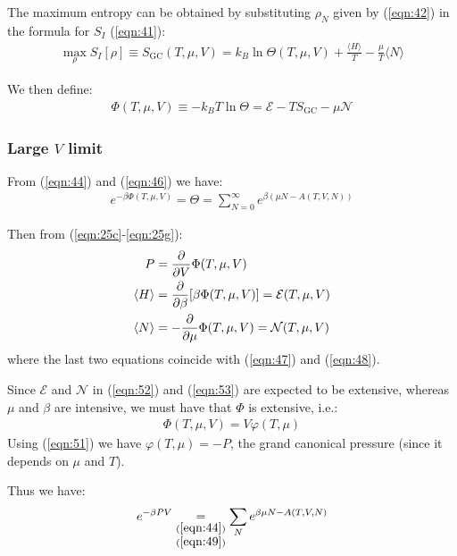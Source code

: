\documentclass[../template.tex]{subfiles}
\begin{document}
\medskip

The maximum entropy can be obtained by substituting $\rho_N$ given by (\ref{eqn:42}) in the formula for $S_I$ (\ref{eqn:41}):
\begin{align*}
    \max_\rho S_I[\rho] \equiv S_{\mathrm{GC}}(T, \mu, V) = k_B \ln \Theta(T, \mu, V) + \frac{\langle H \rangle}{T} - \frac{\mu}{T} \langle N \rangle  
\end{align*}

We then define: %
\begin{align}
    \label{eqn:49}
    \Phi(T, \mu, V) \equiv -k_B T \ln \Theta = \mathcal{E}- T S_{\mathrm{GC}} - \mu \mathcal{N}
\end{align}

\subsubsection{Large $V$ limit}
From (\ref{eqn:44}) and (\ref{eqn:46}) we have:
\begin{align}\label{eqn:50}
    e^{-\beta \Phi(T, \mu, V)} = \Theta = \sum_{N=0}^\infty e^{\beta(\mu N - A (T, V, N))}
\end{align}

Then from (\ref{eqn:25c}-\ref{eqn:25g}):
\begin{align}
    P &= \pdv{V} \Phi(T, \mu, V) \label{eqn:51}\\
    \langle H \rangle &= \pdv{\beta} [\beta \Phi(T, \mu, V)] = \mathcal{E}(T, \mu, V) \label{eqn:52}\\
    \langle N \rangle &= - \pdv{\mu} \Phi(T, \mu, V) = \mathcal{N}(T, \mu, V) \label{eqn:53}
\end{align}
where the last two equations coincide with (\ref{eqn:47}) and (\ref{eqn:48}).

\medskip

Since $\mathcal{E}$ and $\mathcal{N}$ in (\ref{eqn:52}) and (\ref{eqn:53}) are expected to be extensive, whereas $\mu$ and $\beta$ are intensive, we must have that $\Phi$ is extensive, i.e.:
\begin{align}\label{eqn:54}
    \Phi(T, \mu, V) = V \varphi(T, \mu)
\end{align}
Using (\ref{eqn:51}) we have $\varphi(T, \mu) = - P$, the grand canonical pressure (since it depends on $\mu$ and $T$). 

Thus we have:
\begin{align}\label{eqn:55}
    e^{-\beta PV} \underset{\substack{(\ref{eqn:44})\\(\ref{eqn:49})}}{=} \sum_N e^{\beta \mu N - A(T, V, N)}
\end{align}
\end{document}
